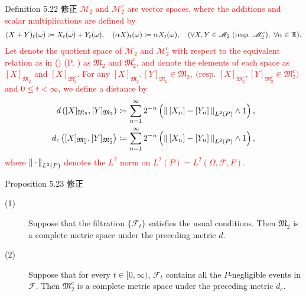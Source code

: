 	\begin{itembox}[l]{Definition 5.22 修正}
		\textcolor{red}{$\mathscr{M}_2$ and $\mathscr{M}_2^c$ are vector spaces, 
		where the additions and scalar multiplications are defined by
		\begin{align}
			(X+Y)_t(\omega) \coloneqq X_t(\omega) + Y_t(\omega),
			\quad (\alpha X)_t(\omega) \coloneqq \alpha X_t(\omega),
			\quad (\forall X,Y \in \mathscr{M}_2\ \mbox{(resp. $\mathscr{M}_2^c$)},\ \forall \alpha \in \mathbb{R}).
		\end{align}
		Let denote the quotient space of $\mathscr{M}_2$ and $\mathscr{M}_2^c$ with respect to
		the equivalent relation as in ()
		(P. \pageref{eq:equivalence_with_respect_to_path}) as $\mathfrak{M}_2$ and $\mathfrak{M}_2^c$,
		and denote the elements of each space as $[X]_{\mathfrak{M}_2}$ and  $[X]_{\mathfrak{M}_2^c}$.
		For any $[X]_{\mathfrak{M}_2},[Y]_{\mathfrak{M}_2} \in \mathfrak{M}_2,\ 
		\mbox{(resp. $[X]_{\mathfrak{M}_2^c},[Y]_{\mathfrak{M}_2^c} \in \mathfrak{M}_2^c$)}$
		and $0 \leq t < \infty$, we define a distance by
		\begin{align}
			d\left([X]_{\mathfrak{M}_2},[Y]_{\mathfrak{M}_2}\right)
			&\coloneqq \sum_{n=1}^\infty 2^{-n}\left(\left\|\, [X_n] - [Y_n]\, \right\|_{L^2(P)} \wedge 1\right), \\
			d_c\left([X]_{\mathfrak{M}_2^c},[Y]_{\mathfrak{M}_2^c}\right)
			&\coloneqq \sum_{n=1}^\infty 2^{-n}\left(\left\|\, [X_n] - [Y_n]\, \right\|_{L^2(P)} \wedge 1\right),
		\end{align}
		where $\left\|\, \cdot\, \right\|_{L^2(P)}$ denotes the $L^2$ norm on $L^2(P) = L^2(\Omega,\mathscr{F},P)$.}
	\end{itembox}
	
	\begin{itembox}[l]{Proposition 5.23 修正}
		\begin{description}
			\item[(1)]
				Suppose that the filtration $\{\mathscr{F}_t\}$ satisfies the usual conditions.
				Then $\mathfrak{M}_2$ is a complete metric space under the preceding metric $d$.
			\item[(2)]
				Suppose that for every $t \in [0,\infty)$,
				$\mathscr{F}_t$ contains all the $P$-negligible events in $\mathscr{F}$.
				Then $\mathfrak{M}_2^c$ is a complete metric space under the preceding metric $d_c$.
		\end{description}
	\end{itembox}
	
